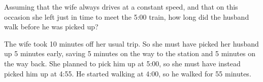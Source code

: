 \documentclass{exam}
\begin{document}
\begin{questions}
Assuming that the wife always drives at a constant speed, and that on this occasion she left just in time to
meet the 5:00 train, how long did the husband walk before he was picked up?

\begin{solution}
  The wife took 10 minutes off her usual trip.  So she must have picked her husband up 5 minutes early, saving 5 minutes
  on the way to the station and 5 minutes on the way back.  She planned to pick him up at 5:00, so she must have instead
  picked him up at 4:55.  He started walking at 4:00, so he walked for 55 minutes.
\end{solution}

\end{questions}
\end{document}
